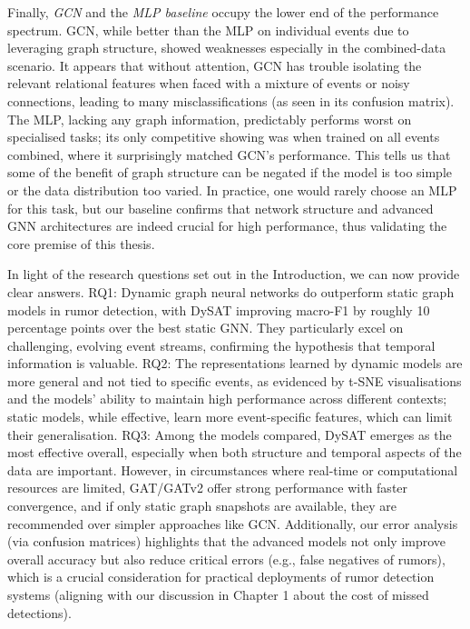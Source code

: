 \documentclass{cshonours}
\begin{document}
\newpage

Finally, \emph{GCN} and the \emph{MLP baseline} occupy the lower end of the performance spectrum. GCN, while better than the MLP on individual events due to leveraging graph structure, showed weaknesses especially in the combined-data scenario. It appears that without attention, GCN has trouble isolating the relevant relational features when faced with a mixture of events or noisy connections, leading to many misclassifications (as seen in its confusion matrix). The MLP, lacking any graph information, predictably performs worst on specialised tasks; its only competitive showing was when trained on all events combined, where it surprisingly matched GCN's performance. This tells us that some of the benefit of graph structure can be negated if the model is too simple or the data distribution too varied. In practice, one would rarely choose an MLP for this task, but our baseline confirms that network structure and advanced GNN architectures are indeed crucial for high performance, thus validating the core premise of this thesis.



In light of the research questions set out in the Introduction, we can now provide clear answers. RQ1: Dynamic graph neural networks do outperform static graph models in rumor detection, with DySAT improving macro-F1 by roughly 10 percentage points over the best static GNN. They particularly excel on challenging, evolving event streams, confirming the hypothesis that temporal information is valuable. RQ2: The representations learned by dynamic models are more general and not tied to specific events, as evidenced by t-SNE visualisations and the models' ability to maintain high performance across different contexts; static models, while effective, learn more event-specific features, which can limit their generalisation. RQ3: Among the models compared, DySAT emerges as the most effective overall, especially when both structure and temporal aspects of the data are important. However, in circumstances where real-time or computational resources are limited, GAT/GATv2 offer strong performance with faster convergence, and if only static graph snapshots are available, they are recommended over simpler approaches like GCN. Additionally, our error analysis (via confusion matrices) highlights that the advanced models not only improve overall accuracy but also reduce critical errors (e.g., false negatives of rumors), which is a crucial consideration for practical deployments of rumor detection systems (aligning with our discussion in Chapter 1 about the cost of missed detections).
\end{document}
